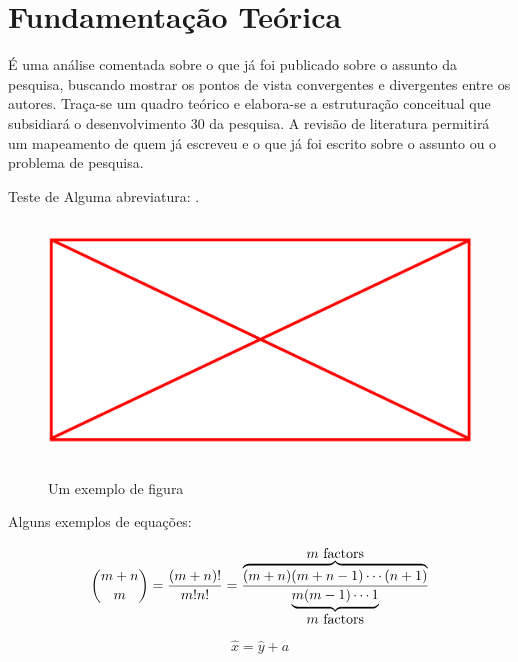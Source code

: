 \chapter{Fundamentação Teórica} \label{cap:fund}
    
    É uma análise comentada sobre o que já foi publicado sobre o assunto da pesquisa, buscando mostrar os pontos de vista convergentes e divergentes entre os autores. Traça-se um quadro teórico e elabora-se a estruturação conceitual que subsidiará o desenvolvimento  30 da pesquisa. A revisão de literatura permitirá um mapeamento de quem já escreveu e o que já foi escrito sobre o assunto ou o problema de pesquisa.

	Teste de Alguma abreviatura: .
	
	\begin{figure}[H]
		\centering
		\caption{Um exemplo de figura}
		\includegraphics[width=\textwidth,height=240px,keepaspectratio]{pdf/noimage.png}
		\label{fig:esquematico_cbi}
	\end{figure}

	Alguns exemplos de equações:
	
	\[
		\binom{m+n}{m} = 
		\frac{(m+n)!}{m!n!} = 
		\frac{
			\overbrace{
				(m+n)(m+n-1)\cdots(n+1)
			}^{\clap{$m$ factors}}
		}{
			\underbrace{
				m(m-1)\cdots 1
			}_{\clap{$m$ factors}}}
	\]
	
	\begin{equation}
		\hat{x} = \hat{y} + a
	\end{equation}
	
